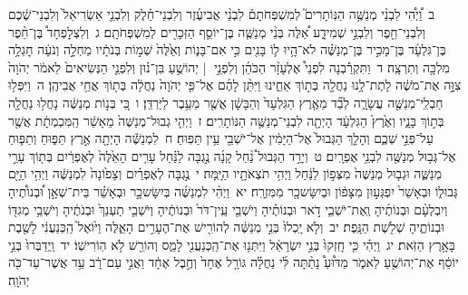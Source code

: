 \documentclass[18pt]{article}
\newcommand{\vart}[1]{\Bfootnote{#1}}	%
\begin{document}
 {\loc ב~}וַ֠יְהִ֠י לִבְנֵ֨י מְנַשֶּׁ֥ה הַנּֽוֹתָרִים֮ לְמִשְׁפְּחֹתָם֒ לִבְנֵ֨י אֲבִיעֶ֜זֶר וְלִבְנֵי־חֵ֗לֶק וְלִבְנֵ֤י אַשְׂרִיאֵל֙ וְלִבְנֵי־שֶׁ֔כֶם וְלִבְנֵי־חֵ֖פֶר וְלִבְנֵ֣י שְׁמִידָ֑ע אֵ֠לֶּה בְּנֵ֨י מְנַשֶּׁ֧ה בֶּן־יוֹסֵ֛ף הַזְּכָרִ֖ים לְמִשְׁפְּחֹתָֽם׃ \startlock
 {\loc ג~}וְלִצְלׇפְחָד֩ בֶּן־חֵ֨פֶר בֶּן־גִּלְעָ֜ד בֶּן־מָכִ֣יר בֶּן־מְנַשֶּׁ֗ה לֹא־הָ֥יוּ ל֛וֹ בָּנִ֖ים כִּ֣י אִם־בָּנ֑וֹת וְאֵ֙לֶּה֙ שְׁמ֣וֹת בְּנֹתָ֔יו מַחְלָ֣ה וְנֹעָ֔ה חׇגְלָ֥ה מִלְכָּ֖ה וְתִרְצָֽה׃ \startlock
 {\loc ד~}וַתִּקְרַ֡בְנָה לִפְנֵי֩ אֶלְעָזָ֨ר הַכֹּהֵ֜ן וְלִפְנֵ֣י  |  יְהוֹשֻׁ֣עַ בִּן־נ֗וּן וְלִפְנֵ֤י הַנְּשִׂיאִים֙ לֵאמֹ֔ר יְהֹוָה֙ צִוָּ֣ה אֶת־מֹשֶׁ֔ה לָתֶת־לָ֥נוּ נַחֲלָ֖ה בְּת֣וֹךְ אַחֵ֑ינוּ וַיִּתֵּ֨ן לָהֶ֜ם אֶל־פִּ֤י יְהֹוָה֙ נַחֲלָ֔ה בְּת֖וֹךְ אֲחֵ֥י אֲבִיהֶֽן׃ \startlock
 {\loc ה~}וַיִּפְּל֥וּ חַבְלֵֽי־מְנַשֶּׁ֖ה עֲשָׂרָ֑ה לְבַ֞ד מֵאֶ֤רֶץ הַגִּלְעָד֙ וְהַבָּשָׁ֔ן אֲשֶׁ֖ר מֵעֵ֥בֶר לַיַּרְדֵּֽן׃ \startlock
 {\loc ו~}כִּ֚י בְּנ֣וֹת מְנַשֶּׁ֔ה נָחֲל֥וּ נַחֲלָ֖ה בְּת֣וֹךְ בָּנָ֑יו וְאֶ֙רֶץ֙ הַגִּלְעָ֔ד הָיְתָ֖ה לִבְנֵי־מְנַשֶּׁ֥ה הַנּוֹתָרִֽים׃ \startlock
 {\loc ז~}וַיְהִ֤י גְבוּל־מְנַשֶּׁה֙ מֵאָשֵׁ֔ר הַֽמִּכְמְתָ֔ת אֲשֶׁ֖ר עַל־פְּנֵ֣י שְׁכֶ֑ם וְהָלַ֤ךְ הַגְּבוּל֙ אֶל־הַיָּמִ֔ין אֶל־יֹשְׁבֵ֖י עֵ֥ין תַּפּֽוּחַ׃ \startlock
 {\loc ח~}לִמְנַשֶּׁ֕ה הָיְתָ֖ה אֶ֣רֶץ תַּפּ֑וּחַ וְתַפּ֛וּחַ אֶל־גְּב֥וּל מְנַשֶּׁ֖ה לִבְנֵ֥י אֶפְרָֽיִם׃ \startlock
 {\loc ט~}וְיָרַ֣ד הַגְּבוּל֩ נַ֨חַל קָנָ֜ה נֶ֣גְבָּה לַנַּ֗חַל עָרִ֤ים הָאֵ֙לֶּה֙ לְאֶפְרַ֔יִם בְּת֖וֹךְ עָרֵ֣י מְנַשֶּׁ֑ה וּגְב֤וּל מְנַשֶּׁה֙ מִצְּפ֣וֹן לַנַּ֔חַל וַיְהִ֥י תֹצְאֹתָ֖יו הַיָּֽמָּה׃ \startlock
 {\loc י~}נֶ֣גְבָּה לְאֶפְרַ֗יִם וְצָפ֙וֹנָה֙ לִמְנַשֶּׁ֔ה וַיְהִ֥י הַיָּ֖ם גְּבוּל֑וֹ וּבְאָשֵׁר֙ יִפְגְּע֣וּן מִצָּפ֔וֹן וּבְיִשָּׂשכָ֖ר מִמִּזְרָֽח׃ \startlock
 {\loc יא~}וַיְהִ֨י לִמְנַשֶּׁ֜ה בְּיִשָּׂשכָ֣ר וּבְאָשֵׁ֗ר בֵּית־שְׁאָ֣ן וּ֠בְנוֹתֶ֠יהָ וְיִבְלְעָ֨ם וּבְנוֹתֶ֜יהָ וְֽאֶת־יֹשְׁבֵ֧י דֹ֣אר וּבְנוֹתֶ֗יהָ וְיֹשְׁבֵ֤י עֵֽין־דֹּר֙ וּבְנוֹתֶ֔יהָ וְיֹשְׁבֵ֤י תַעְנַךְ֙ וּבְנֹתֶ֔יהָ וְיֹשְׁבֵ֥י מְגִדּ֖וֹ וּבְנוֹתֶ֑יהָ שְׁלֹ֖שֶׁת הַנָּֽפֶת׃ \startlock
 {\loc יב~}וְלֹ֤א יָֽכְלוּ֙ בְּנֵ֣י מְנַשֶּׁ֔ה לְהוֹרִ֖ישׁ אֶת־הֶעָרִ֣ים הָאֵ֑לֶּה וַיּ֙וֹאֶל֙ הַֽכְּנַעֲנִ֔י לָשֶׁ֖בֶת בָּאָ֥רֶץ הַזֹּֽאת׃ \startlock
 {\loc יג~}וַיְהִ֗י כִּ֤י חָֽזְקוּ֙ בְּנֵ֣י יִשְׂרָאֵ֔ל וַיִּתְּנ֥וּ אֶת־הַֽכְּנַעֲנִ֖י לָמַ֑ס וְהוֹרֵ֖שׁ לֹ֥א הֽוֹרִישֽׁוֹ׃ \startlock
 {\loc יד~}וַֽיְדַבְּרוּ֙ בְּנֵ֣י יוֹסֵ֔ף אֶת־יְהוֹשֻׁ֖עַ לֵאמֹ֑ר מַדּ֩וּעַ֩ נָתַ֨תָּה לִּ֜י נַחֲלָ֗ה גּוֹרָ֤ל אֶחָד֙ וְחֶ֣בֶל אֶחָ֔ד וַאֲנִ֣י עַם־רָ֔ב עַ֥ד אֲשֶׁר־עַד־כֹּ֖ה  \edtext{בֵּרְכַ֥נִי}{\vart{א=בֵּרֲכַ֥נִי | }}  יְהֹוָֽה׃ \startlock
\end{document}
